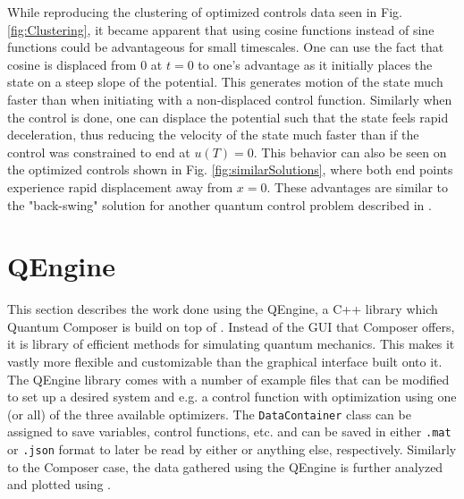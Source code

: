 \documentclass[a4paper, twocolumn]{revtex4-1}
\begin{document}
While reproducing the clustering of optimized controls data seen in Fig. \ref{fig:Clustering}, it became apparent that using cosine functions instead of sine functions could be advantageous for small timescales. One can use the fact that cosine is displaced from 0 at $t=0$ to one's advantage as it initially places the state on a steep slope of the potential. This generates motion of the state much faster than when initiating with a non-displaced control function. Similarly when the control is done, one can displace the potential such that the state feels rapid deceleration, thus reducing the velocity of the state much faster than if the control was constrained to end at $u(T)=0$. This behavior can also be seen on the optimized controls shown in Fig. \ref{fig:similarSolutions}, where both end points experience rapid displacement away from $x=0$. These advantages are similar to the "back-swing" solution for another quantum control problem described in \cite{QM2Paper}.

\section{QEngine}\label{sec:QEngine}
This section describes the work done using the QEngine, a C++ library which Quantum Composer is build on top of \cite{ahmed2020quantum, QEngine}. Instead of the GUI that Composer offers, it is library of efficient methods for simulating quantum mechanics. This makes it vastly more flexible and customizable than the graphical interface built onto it. The QEngine library comes with a number of example files that can be modified to set up a desired system and e.g. a control function with optimization using one (or all) of the three available optimizers. The \texttt{DataContainer} class can be assigned to save variables, control functions, etc. and can be saved in either \texttt{.mat} or \texttt{.json} format to later be read by either  or anything else, respectively. Similarly to the Composer case, the data gathered using the QEngine is further analyzed and plotted using . \\
\end{document}
